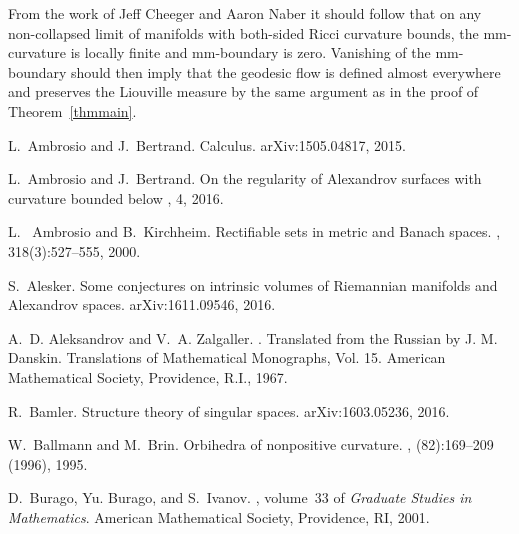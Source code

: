 \documentclass[12pt,leqno,intlimits]{amsart}
\numberwithin{equation}{section}
\theoremstyle{definition}
\theoremstyle{remark}
\begin{document}
From the work of Jeff Cheeger and Aaron Naber \cite{Ch-Na-codim4} it should follow that on any non-collapsed limit of manifolds with both-sided Ricci curvature bounds, the mm-curvature is locally finite and mm-boundary is zero.
Vanishing of the mm-boundary should then imply that the geodesic flow is defined almost everywhere and preserves the Liouville measure by the same argument as in the proof of Theorem~\ref{thmmain}.

%
\begin{thebibliography}{KMS01}





L.~Ambrosio and J.~Bertrand.
 {C}alculus.
\newblock arXiv:1505.04817, 2015.



L.~Ambrosio and J.~Bertrand.
\newblock On the regularity of {Alexandrov} surfaces with curvature bounded below
, 4,  2016.






L.~ Ambrosio and B.~Kirchheim.
\newblock Rectifiable sets in metric and {B}anach spaces.
, 318(3):527--555, 2000.

S.~Alesker.
\newblock Some conjectures on intrinsic volumes of {R}iemannian manifolds and
{Alexandrov} spaces.
\newblock arXiv:1611.09546, 2016.

A.~D. Aleksandrov and V.~A. Zalgaller.
.
\newblock Translated from the Russian by J. M. Danskin. Translations of
Mathematical Monographs, Vol. 15. American Mathematical Society, Providence,
R.I., 1967.

R.~Bamler.
\newblock Structure theory of singular spaces.
\newblock arXiv:1603.05236, 2016.

W.~Ballmann and M.~Brin.
\newblock Orbihedra of nonpositive curvature.
, (82):169--209 (1996),
1995.

D.~Burago, Yu. Burago, and S.~Ivanov.
, volume~33 of {\em Graduate Studies
in Mathematics}.
\newblock American Mathematical Society, Providence, RI, 2001.


\end{thebibliography}
\end{document}
